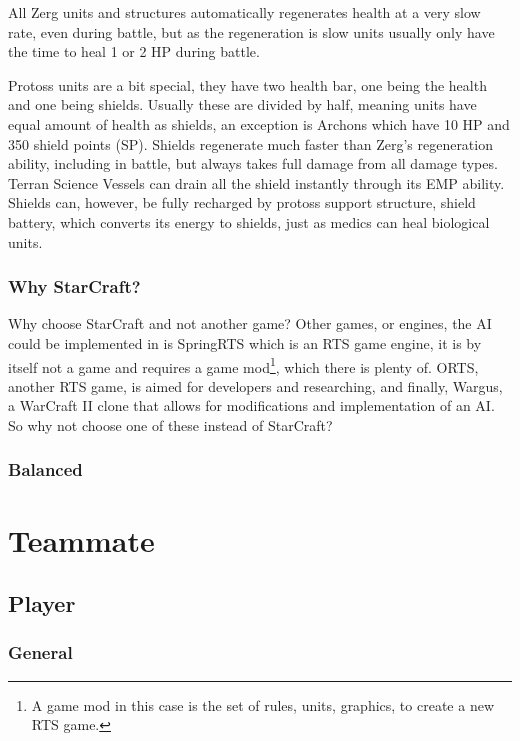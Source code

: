 All Zerg units and structures automatically regenerates health at a very slow rate, even during battle, but as the regeneration is slow units usually only have the time to heal 1 or 2 HP during battle.

Protoss units are a bit special, they have two health bar, one being the health and one being shields. Usually these are divided by half, meaning units have equal amount of health as shields, an exception is Archons which have 10 HP and 350 shield points (SP). Shields regenerate much faster than Zerg’s regeneration ability, including in battle, but always takes full damage from all damage types. Terran Science Vessels can drain all the shield instantly through its EMP ability. Shields can, however, be fully recharged by protoss support structure, shield battery, which converts its energy to shields, just as medics can heal biological units.

\subsubsection{Why StarCraft?}
Why choose StarCraft and not another game? Other games, or engines, the AI could be implemented in is SpringRTS\cite{springrts} which is an RTS game engine, it is by itself not a game and requires a game mod\footnote{A game mod in this case is the set of rules, units, graphics, to create a new RTS game.}, which there is plenty of. ORTS\cite{orts}, another RTS game, is aimed for developers and researching, and finally, Wargus\cite{wargus}, a WarCraft II clone that allows for modifications and implementation of an AI. So why not choose one of these instead of StarCraft?



\subsubsection{Balanced}

\section{Teammate}

\subsection{Player}

\subsubsection{General}

